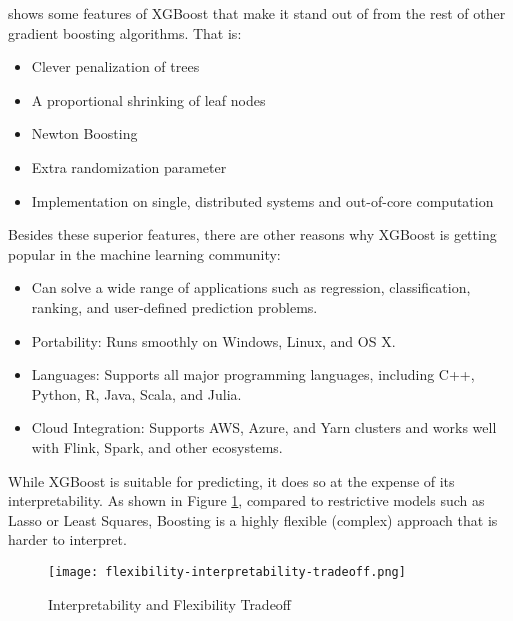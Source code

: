 \textcite{nielsen2016tree} shows some features of XGBoost that make it stand out
of from the rest of other gradient boosting algorithms. That is:
\begin{itemize}
    \item Clever penalization of trees
    \item A proportional shrinking of leaf nodes
    \item Newton Boosting
    \item Extra randomization parameter
    \item Implementation on single, distributed systems and out-of-core computation
\end{itemize}
Besides these superior features, there are other reasons why XGBoost is getting
popular in the machine learning community:
\begin{itemize}
    \item Can solve a wide range of applications such as regression,
        classification, ranking, and user-defined prediction problems.
    \item Portability: Runs smoothly on Windows, Linux, and OS X.
    \item Languages: Supports all major programming languages, including C++,
        Python, R, Java, Scala, and Julia.
    \item Cloud Integration: Supports AWS, Azure, and Yarn clusters and works
        well with Flink, Spark, and other ecosystems.
\end{itemize}


While XGBoost is suitable for predicting, it does so at the expense of its
interpretability.  As shown in Figure
\ref{fig:flexibility-interpretability-tradeoff}, compared to restrictive models
such as Lasso or Least Squares, Boosting is a highly flexible (complex) approach
that is harder to interpret.

\begin{figure}[H]\centering
    \texttt{[image: flexibility-interpretability-tradeoff.png]}
    \caption{Interpretability and Flexibility Tradeoff}
    \label{fig:flexibility-interpretability-tradeoff}
\end{figure}


